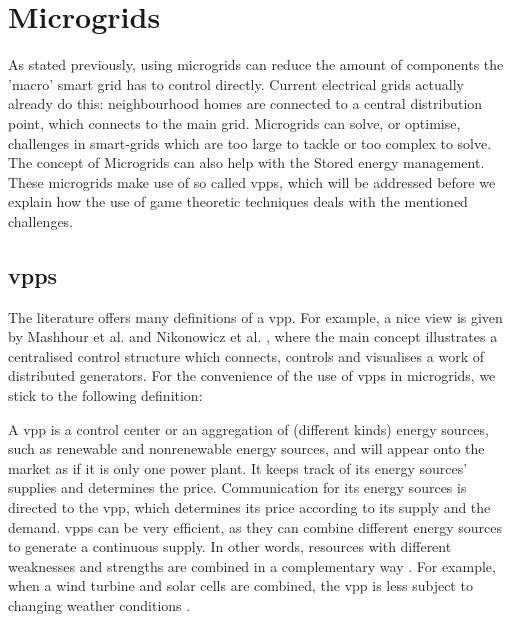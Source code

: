 \section{Microgrids}



As stated previously, using microgrids can reduce the amount of components the 'macro' smart grid has to control directly. Current electrical grids actually already do this: neighbourhood homes are connected to a central distribution point, which connects to the main grid.
Microgrids can solve, or optimise, challenges in smart-grids which are too large to tackle or too complex to solve\cite{MicrogridModellingPetrosAristidou}. The concept of Microgrids can also help with the Stored energy management.
These microgrids make use of so called \acp{vpp}, which will be addressed before we explain how the use of game theoretic techniques deals with the mentioned challenges.



\subsection{\aclp{vpp}}
The literature offers many definitions of a \ac{vpp}. For example, a nice view is given by Mashhour et al. \cite{MashhourMoghaddas-Tafreshi2011} and Nikonowicz et al. \cite{NikonowiczMilewski2012}, where the main concept illustrates a centralised control structure which connects, controls and visualises a work of distributed generators. For the convenience of the use of \acp{vpp} in microgrids, we stick to the following definition:

A \ac{vpp} is a control center or an aggregation of (different kinds) energy sources, such as renewable and nonrenewable energy sources, and will appear onto the market as if it is only one power plant. It keeps track of its energy sources' supplies and determines the price. Communication for its energy sources is directed to the \ac{vpp}, which determines its price according to its supply and the demand. \acp{vpp} can be very efficient, as they can combine different energy sources to generate a continuous supply. In other words, resources with different weaknesses and strengths are combined in a complementary way \cite{Koeppel2003}. For example, when a wind turbine and solar cells are combined, the \ac{vpp} is less subject to changing weather conditions \cite{Tromly2001, Kumagai2012, MashhourMoghaddas-Tafreshi2011, NikonowiczMilewski2012}. 

